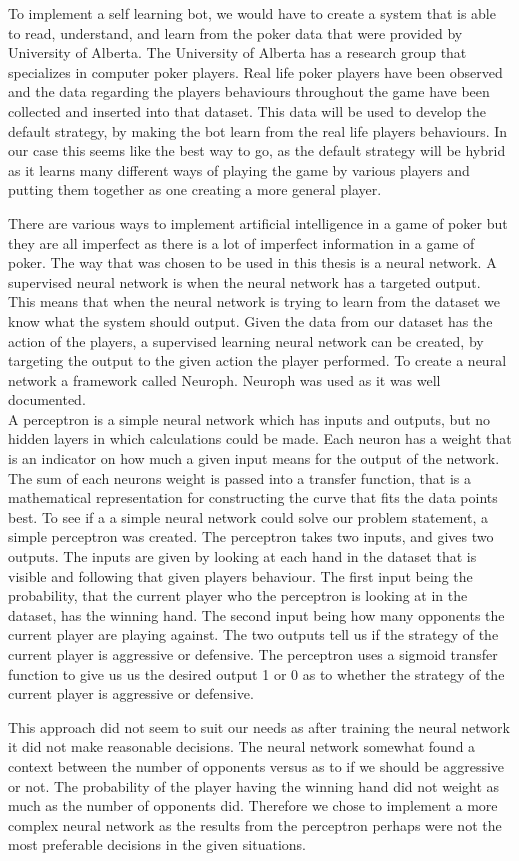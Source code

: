 To implement a self learning bot, we would have to create a system that is able to read, understand, and learn from the poker data that were provided by University of Alberta. The University of Alberta has a research group that specializes in computer poker players.  Real life poker players have been observed and the data regarding the players behaviours throughout the game have been collected and inserted into that
 dataset. 
This data will be used to develop the default strategy, by making the bot learn from the real life players behaviours.
In our case this seems like the best way to go, as the default strategy will be hybrid as it learns many different ways of 
playing the game by various players and putting them together as one creating a more general player.


There are various ways to implement artificial intelligence in a game of poker but they are all imperfect as there is a lot of imperfect information in a game of poker. The way that was chosen to be used in this thesis is a neural network. A supervised neural network is when the neural network has a targeted output. This means that when the neural network is trying to learn from the dataset we know what the system should output. Given the data from our dataset has the action of the players, a supervised learning neural network can be created, by targeting the output to the given action the player performed. To create a neural network a framework called Neuroph. Neuroph was used as it was well documented.\\


A perceptron is a simple neural network which has inputs and outputs, but no hidden layers in which calculations could be made. Each neuron has a weight that is an indicator on how much a given input means for the output of the network. The sum of each neurons weight is passed into a transfer function, that is a mathematical representation for constructing the curve that fits the data points best.
To see if a a simple neural network could solve our problem statement, a simple perceptron was created. The perceptron takes two inputs, and gives two outputs. The inputs are given by looking at each hand in the dataset that is visible and following that given players behaviour.
The first input being the probability, that the current player who the perceptron is looking at in the dataset, has the winning hand. The second input being how many opponents the current player are playing against. 
The two outputs tell us if the strategy of the current player is aggressive or defensive. 
The perceptron uses a sigmoid transfer function to give us us the desired output 1 or 0 as to whether the strategy of the current player is aggressive or defensive.

This approach did not seem to suit our needs as after training the neural network it did not make reasonable decisions. The neural network somewhat found a context between the number of opponents versus as to if we should be aggressive or not. The probability of the player having the winning hand did not weight as much as the number of opponents did. Therefore we chose to implement a more complex neural network as the results from the perceptron perhaps were not the most preferable decisions in the given situations.\\


